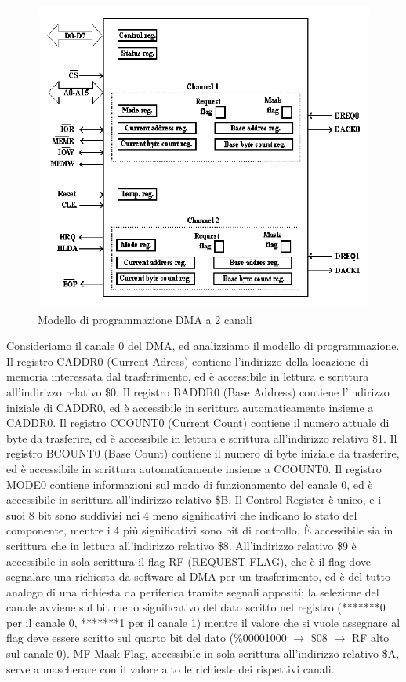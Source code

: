 \begin{figure}[ht]
    \centering
    \includegraphics[width=.7\textwidth]{img/DMA.png}
    \caption{Modello di programmazione DMA a 2 canali}
    \label{img:DMA}
\end{figure}

Consideriamo il canale 0 del DMA, ed analizziamo il modello di programmazione.
Il registro CADDR0 (Current Adress) contiene l'indirizzo della locazione di memoria interessata dal trasferimento, ed è accessibile in lettura e scrittura all'indirizzo relativo \$0. Il registro BADDR0 (Base Address) contiene l'indirizzo iniziale di CADDR0, ed è accessibile in scrittura automaticamente insieme a CADDR0. 
Il registro CCOUNT0 (Current Count) contiene il numero attuale di byte da trasferire, ed è accessibile in lettura e scrittura all'indirizzo relativo \$1. Il registro BCOUNT0 (Base Count) contiene il numero di byte iniziale da trasferire, ed è accessibile in scrittura automaticamente insieme a CCOUNT0. Il registro MODE0 contiene informazioni sul modo di funzionamento del canale 0, ed è accessibile in scrittura all'indirizzo relativo \$B. Il Control Register è unico, e i suoi 8 bit sono suddivisi nei 4 meno significativi che indicano lo stato del componente, mentre i 4 più significativi sono bit di controllo. \uppercase{è} accessibile sia in scrittura che in lettura all'indirizzo relativo \$8.
All'indirizzo relativo \$9 è accessibile in sola scrittura il flag RF (REQUEST FLAG), che è il flag dove segnalare una richiesta da software al DMA per un trasferimento, ed è del tutto analogo di una richiesta da periferica tramite segnali appositi; la selezione del canale avviene sul bit meno significativo del dato scritto nel registro (*******0 per il canale 0, *******1 per il canale 1) mentre il valore che si vuole assegnare al flag deve essere scritto sul quarto bit del dato (\%00001000 $\rightarrow$ \$08 $\rightarrow$ RF alto sul canale 0). MF Mask Flag, accessibile in sola scrittura all'indirizzo relativo \$A, serve a mascherare con il valore alto le richieste dei rispettivi canali.  


